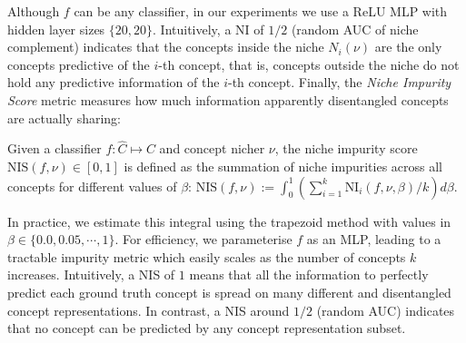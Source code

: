 Although $f$ can be any classifier, in our experiments we use a ReLU MLP with hidden layer sizes $\{ 20, 20 \}$.
Intuitively, a NI of $1/2$ (random AUC of niche complement) indicates that the concepts inside the niche $N_i(\nu)$ are the only concepts predictive of the $i$-th concept, that is, concepts outside the niche do not hold any predictive information of the $i$-th concept.
Finally, the \textit{Niche Impurity Score} metric measures how much information apparently disentangled concepts
are actually sharing:

\begin{definition} \label{def:niche_impurity_score}
Given a classifier $f: \hat{C} \mapsto C$ and concept nicher $\nu$, the niche impurity score $\text{NIS}(f,\nu) \in [0,1]$ is defined as the summation of niche impurities across all concepts for different values of $\beta$: $\text{NIS}(f,\nu) := \int_{0}^{1} (\sum_{i=1}^{k} \text{NI}_i(f, \nu, \beta)/k) d\beta$.
\end{definition}

In practice, we estimate this integral using the trapezoid method with values in $\beta \in \{ 0.0, 0.05, \cdots, 1\}$. For efficiency, we parameterise $f$ as an MLP,
leading to a tractable impurity metric which easily scales as the number of concepts $k$ increases. Intuitively, a NIS of $1$ means that all the information to perfectly predict each ground truth concept is spread on many different and disentangled concept representations. In contrast, a NIS around $1/2$ (random AUC) indicates that no concept can be predicted by any concept representation subset.

